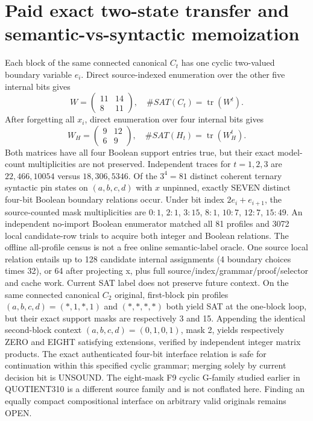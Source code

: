 \documentclass[11pt]{article}
\begin{document}
\section{Paid exact two-state transfer and semantic-vs-syntactic memoization}
Each block of the same connected canonical $C_t$ has one cyclic two-valued boundary variable $e_i$. Direct source-indexed enumeration over the other five internal bits gives
\[
W=\begin{pmatrix}11&14\\8&11\end{pmatrix},\quad \#SAT(C_t)=\operatorname{tr}(W^t).
\]
After forgetting all $x_i$, direct enumeration over four internal bits gives
\[
W_H=\begin{pmatrix}9&12\\6&9\end{pmatrix},\quad \#SAT(H_t)=\operatorname{tr}(W_H^t).
\]
Both matrices have all four Boolean support entries true, but their exact model-count multiplicities are not preserved. Independent traces for $t=1,2,3$ are $22,466,10054$ versus $18,306,5346$.
Of the $3^4=81$ distinct coherent ternary syntactic pin states on $(a,b,c,d)$ with $x$ unpinned, exactly SEVEN distinct four-bit Boolean boundary relations occur. Under bit index $2e_i+e_{i+1}$, the source-counted mask multiplicities are $0:1$, $2:1$, $3:15$, $8:1$, $10:7$, $12:7$, $15:49$. An independent no-import Boolean enumerator matched all 81 profiles and 3072 local candidate-row trials to acquire both integer and Boolean relations. The offline all-profile census is not a free online semantic-label oracle. One source local relation entails up to 128 candidate internal assignments (4 boundary choices times 32), or 64 after projecting x, plus full source/index/grammar/proof/selector and cache work.
Current SAT label does not preserve future context. On the same connected canonical $C_2$ original, first-block pin profiles $(a,b,c,d)=(*,1,*,1)$ and $(*,*,*,*)$ both yield SAT at the one-block loop, but their exact support masks are respectively 3 and 15. Appending the identical second-block context $(a,b,c,d)=(0,1,0,1)$, mask 2, yields respectively ZERO and EIGHT satisfying extensions, verified by independent integer matrix products. The exact authenticated four-bit interface relation is safe for continuation within this specified cyclic grammar; merging solely by current decision bit is UNSOUND. The eight-mask F9 cyclic G-family studied earlier in QUOTIENT310 is a different source family and is not conflated here. Finding an equally compact compositional interface on arbitrary valid originals remains OPEN.
\end{document}

